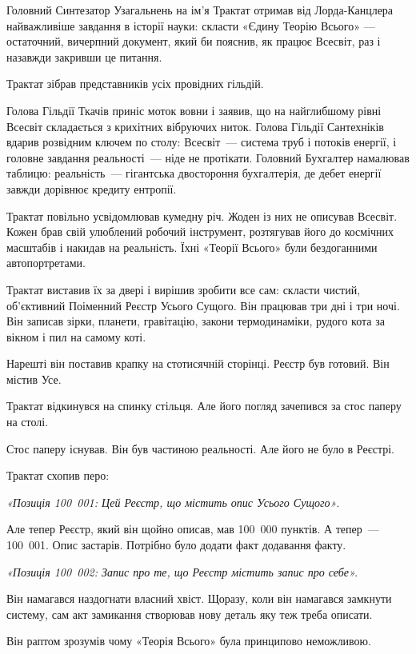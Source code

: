 \documentclass[12pt, a4paper, openany]{book}
\begin{document}
\begin{terrybox}
Головний Синтезатор Узагальнень на ім'я Трактат отримав від Лорда-Канцлера найважливіше завдання в історії науки: скласти «Єдину Теорію Всього» — остаточний, вичерпний документ, який би пояснив, як працює Всесвіт, раз і назавжди закривши це питання.

Трактат зібрав представників усіх провідних гільдій.

Голова Гільдії Ткачів приніс моток вовни і заявив, що на найглибшому рівні Всесвіт складається з крихітних вібруючих ниток. Голова Гільдії Сантехніків вдарив розвідним ключем по столу: Всесвіт~--- система труб і потоків енергії, і головне завдання реальності~--- ніде не протікати. Головний Бухгалтер намалював таблицю: реальність~--- гігантська двостороння бухгалтерія, де дебет енергії завжди дорівнює кредиту ентропії.

Трактат повільно усвідомлював кумедну річ. Жоден із них не описував Всесвіт. Кожен брав свій улюблений робочий інструмент, розтягував його до космічних масштабів і накидав на реальність. Їхні «Теорії Всього» були бездоганними автопортретами.

\medskip
Трактат виставив їх за двері і вирішив зробити все сам: скласти чистий, об'єктивний Поіменний Реєстр Усього Сущого. Він працював три дні і три ночі. Він записав зірки, планети, гравітацію, закони термодинаміки, рудого кота за вікном і пил на самому коті.

Нарешті він поставив крапку на стотисячній сторінці. Реєстр був готовий. Він містив Усе.

Трактат відкинувся на спинку стільця. Але його погляд зачепився за стос паперу на столі.

Стос паперу існував. Він був частиною реальності. Але його не було в Реєстрі.

Трактат схопив перо:

\textit{«Позиція 100~001: Цей Реєстр, що містить опис Усього Сущого»}.

Але тепер Реєстр, який він щойно описав, мав 100~000 пунктів. А тепер~--- 100~001. Опис застарів. Потрібно було додати факт додавання факту.

\textit{«Позиція 100~002: Запис про те, що Реєстр містить запис про себе».}

Він намагався наздогнати власний хвіст. Щоразу, коли він намагався замкнути систему, сам акт замикання створював нову деталь яку теж треба описати.

\medskip
Він раптом зрозумів чому «Теорія Всього» була принципово неможливою.


\end{terrybox}
\end{document}
